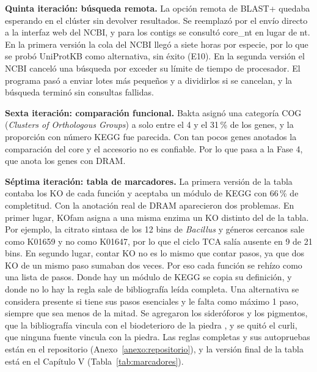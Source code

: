 \textbf{Quinta iteración: búsqueda remota.} La opción remota de BLAST+ quedaba
esperando en el clúster sin devolver resultados. Se reemplazó por el envío
directo a la interfaz web del NCBI, y para los contigs se consultó core\_nt en
lugar de nt. En la primera versión la cola del NCBI llegó a siete horas por
especie, por lo que se probó UniProtKB como alternativa, sin éxito (E10). En la
segunda versión el NCBI canceló una búsqueda por exceder su límite de tiempo de
procesador. El programa pasó a enviar lotes más pequeños y a dividirlos si se
cancelan, y la búsqueda terminó sin consultas fallidas.

\textbf{Sexta iteración: comparación funcional.} Bakta asignó una categoría COG
(\textit{Clusters of Orthologous Groups}) a solo entre el 4 y el 31\,\% de los
genes, y la proporción con número KEGG fue parecida. Con tan pocos genes
anotados la comparación del core y el accesorio no es confiable. Por lo que pasa
a la Fase 4, que anota los genes con DRAM.

\begin{nuevo}
\textbf{Séptima iteración: tabla de marcadores.} La primera versión de la
tabla contaba los KO de cada función y aceptaba un módulo de KEGG con 66\,\% de
completitud. Con la anotación real de DRAM aparecieron dos problemas. En primer
lugar, KOfam asigna a una misma enzima un KO distinto del de la tabla. Por
ejemplo, la citrato sintasa de los 12 bins de \textit{Bacillus} y géneros
cercanos sale como K01659 y no como K01647, por lo que el ciclo TCA salía
ausente en 9 de 21 bins. En segundo lugar, contar KO no es lo mismo que contar
pasos, ya que dos KO de un mismo paso sumaban dos veces. Por eso cada función se
rehízo como una lista de pasos. Donde hay un módulo de KEGG se copia su
definición, y donde no lo hay la regla sale de bibliografía leída completa. Una
alternativa se considera presente si tiene sus pasos esenciales y le falta como
máximo 1 paso, siempre que sea menos de la mitad. Se agregaron los sideróforos
y los pigmentos, que la bibliografía vincula con el biodeterioro de la piedra
\cite{gaylarde2021, dakal2012}, y se quitó el curli, que ninguna fuente
vincula con la piedra. Las reglas completas y sus autopruebas están en el
repositorio (Anexo~\ref{anexo:repositorio}), y la versión final de la tabla
está en el Capítulo V (Tabla~\ref{tab:marcadores}).
\end{nuevo}
